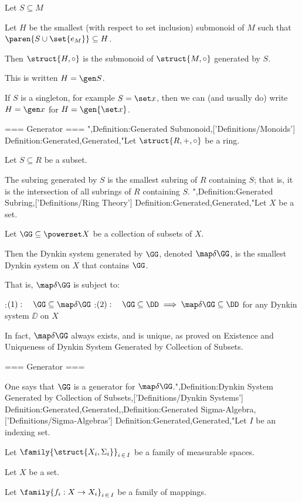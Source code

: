Let $S \subseteq M$

Let $H$ be the smallest (with respect to set inclusion) submonoid of $M$ such that $\paren {S \cup \set {e_M} } \subseteq H$.


Then $\struct {H, \circ}$ is the submonoid of $\struct {M, \circ}$ generated by $S$.


This is written $H = \gen S$.


If $S$ is a singleton, for example $S = \set x$, then we can (and usually do) write $H = \gen x$ for $H = \gen {\set x}$.


=== Generator ===
",Definition:Generated Submonoid,['Definitions/Monoids']
Definition:Generated,Generated,"Let $\struct {R, +, \circ}$ be a ring.

Let $S \subseteq R$ be a subset.


The subring generated by $S$ is the smallest subring of $R$ containing $S$; that is, it is the intersection of all subrings of $R$ containing $S$.
",Definition:Generated Subring,['Definitions/Ring Theory']
Definition:Generated,Generated,"Let $X$ be a set.

Let $\GG \subseteq \powerset X$ be a collection of subsets of $X$.


Then the Dynkin system generated by $\GG$, denoted $\map \delta \GG$, is the smallest Dynkin system on $X$ that contains $\GG$.

That is, $\map \delta \GG$ is subject to:

:$(1):\quad \GG \subseteq \map \delta \GG$
:$(2):\quad \GG \subseteq \DD \implies \map \delta \GG \subseteq \DD$ for any Dynkin system $\DD$ on $X$


In fact, $\map \delta \GG$ always exists, and is unique, as proved on Existence and Uniqueness of Dynkin System Generated by Collection of Subsets.


=== Generator ===

One says that $\GG$ is a generator for $\map \delta \GG$.",Definition:Dynkin System Generated by Collection of Subsets,['Definitions/Dynkin Systems']
Definition:Generated,Generated,,Definition:Generated Sigma-Algebra,['Definitions/Sigma-Algebras']
Definition:Generated,Generated,"Let $I$ be an indexing set.

Let $\family {\struct {X_i, \Sigma_i} }_{i \mathop \in I}$ be a family of measurable spaces.

Let $X$ be a set.

Let $\family {f_i: X \to X_i}_{i \mathop \in I}$ be a family of mappings.


